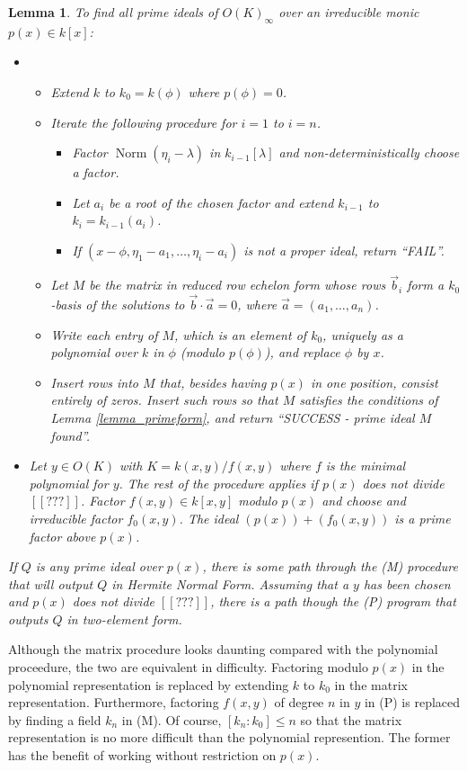 \documentclass[12pt,reqno]{amsart}
\numberwithin{equation}{section}
\newtheorem{lemma}[theorem]{Lemma}
\newcommand{\op}[1]  { \operatorname{ #1 }}
\begin{document}
\begin{lemma}
 To find all prime ideals of $O(K)_{\infty}$ over an irreducible monic $p(x) \in k[x]$:
\begin{itemize}
\item[(M)]
\begin{itemize}
\item Extend $k$ to $k_0=k(\phi)$ where $p(\phi)=0$.
\item Iterate the following procedure for $i=1$ to $i=n$.
\begin{itemize}
\item Factor $\op{Norm}(\eta_i-\lambda)$ in $k_{i-1}[\lambda]$ and non-deterministically choose a factor.
\item Let $a_i$ be a root of the chosen factor and extend $k_{i-1}$ to $k_i=k_{i-1}(a_i)$.
\item If $(x-\phi,\eta_1-a_1,\dots,\eta_i-a_i)$ is not a proper ideal, return ``FAIL''.
\end{itemize}
\item Let $M$ be the matrix in reduced row echelon form whose rows $\vec{b}_i$ form a $k_0$-basis of the solutions to $\vec{b} \cdot \vec{a}=0$, where $\vec{a}=(a_1,\dots,a_n)$.
\item Write each entry of $M$, which is an element of $k_0$, uniquely as a polynomial over $k$ in $\phi$ (modulo $p(\phi)$), and replace $\phi$ by $x$.
\item Insert rows into $M$ that, besides having $p(x)$ in one position, consist entirely of zeros. Insert such rows so that $M$ satisfies the conditions of Lemma \ref{lemma_primeform}, and return ``SUCCESS - prime ideal $M$ found''.
\end{itemize}

\item[(P)] Let $y \in O(K)$ with $K=k(x,y)/f(x,y)$ where $f$ is the minimal polynomial for $y$. The rest of the procedure applies if $p(x)$ does not divide $[[???]]$. Factor $f(x,y)\in k[x,y]$ modulo $p(x)$ and choose and irreducible factor $f_0(x,y)$. The ideal $(p(x)) + (f_0(x,y))$ is a prime factor above $p(x)$.
\end{itemize}
If $Q$ is any prime ideal over $p(x)$, there is some path through the (M) procedure that will output $Q$ in Hermite Normal Form. Assuming that a $y$ has been chosen and $p(x)$ does not divide $[[???]]$, there is a path though the (P) program that outputs $Q$ in two-element form.
\end{lemma}

Although the matrix procedure looks daunting compared with the polynomial proceedure, the two are equivalent in difficulty. Factoring modulo $p(x)$ in the polynomial representation is replaced by extending $k$ to $k_0$ in the matrix representation. Furthermore, factoring $f(x,y)$ of degree $n$ in $y$ in (P) is replaced by finding a field $k_n$ in (M). Of course, $[k_n:k_0] \le n$ so that the matrix representation is no more difficult than the polynomial represention. The former has the benefit of working without restriction on $p(x)$.
\end{document}
